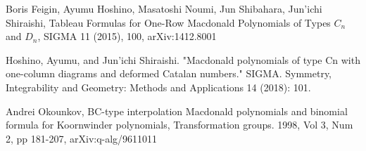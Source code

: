 \documentclass{article}
\begin{document}
\begin{thebibliography}{12}




 Boris Feigin, Ayumu Hoshino, Masatoshi Noumi, Jun Shibahara, Jun'ichi Shiraishi, Tableau Formulas for One-Row Macdonald Polynomials of Types $C_n$ and $D_n$, SIGMA 11 (2015), 100, arXiv:1412.8001

 Hoshino, Ayumu, and Jun'ichi Shiraishi. "Macdonald polynomials of type Cn with one-column diagrams and deformed Catalan numbers." SIGMA. Symmetry, Integrability and Geometry: Methods and Applications 14 (2018): 101.

 Andrei Okounkov, BC-type interpolation Macdonald polynomials and binomial formula for Koornwinder polynomials,
Transformation groups. 1998, Vol 3, Num 2, pp 181-207, arXiv:q-alg/9611011


\end{thebibliography}
\end{document}
